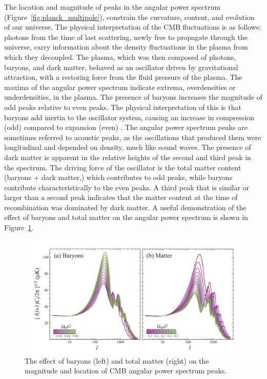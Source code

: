 The location and magnitude of peaks in the angular power spectrum (Figure~\ref{fig:planck_multipole}), constrain the curvature, content, and evolution of our universe. The physical interpretation of the \ac{CMB} fluctuations is as follows: photons from the time of last scattering, newly free to propagate through the universe, carry information about the density fluctuations in the plasma from which they decoupled. The plasma, which was then composed of photons, baryons, and dark matter, behaved as an oscillator driven by gravitational attraction, with a restoring force from the fluid pressure of the plasma. The maxima of the angular power spectrum indicate extrema, overdensities or underdensities, in the plasma. The presence of baryons increases the magnitude of odd peaks relative to even peaks. The physical interpretation of this is that baryons add inertia to the oscillator system, causing an increase in compression (odd) compared to expansion (even) \cite{Hu2008}. The angular power spectrum peaks are sometimes referred to acoustic peaks, as the oscillations that produced them were longitudinal and depended on density, much like sound waves. The presence of dark matter is apparent in the relative heights of the second and third peak in the spectrum. The driving force of the oscillator is the total matter content (baryons + dark matter,) which contributes to odd peaks, while baryons contribute characteristically to the even peaks. A third peak that is similar or larger than a second peak indicates that the matter content at the time of recombination was dominated by dark matter. A useful demonstration of the effect of baryons and total matter on the angular power spectrum is shown in Figure~\ref{fig:matter_baryons}.

\begin{figure}[htbp]
\begin{center}
\includegraphics[width=\textwidth]{figures/theory/matter_baryons.png}
\caption{The effect of baryons (left) and total matter (right) on the magnitude and location of \acs{CMB} angular power spectrum peaks.  \cite{Hu2008} }
\label{fig:matter_baryons}
\end{center}
\end{figure}

